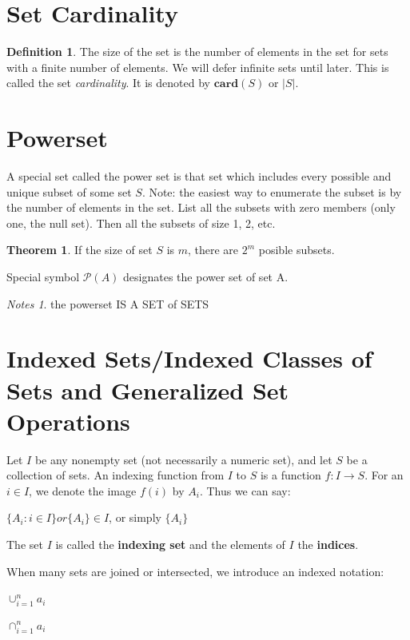 \documentclass[11pt]{book} %
\theoremstyle {definition}
\newtheorem {definition}{Definition}[section]
\newtheorem {theorem}{Theorem}[section]
\theoremstyle {remark}
\newtheorem*{notes}{Notes}
\begin{document}
\section {Set Cardinality}
\begin {definition}
The size of the set is the number of elements in the set for sets with a finite number of elements. We will defer infinite sets until later. This is called the set \textit{cardinality}. It is denoted by $\mathbf{card}(S)$ or $|S|$.
\end{definition}

\section {Powerset}
A special set called the power set is that set which includes every possible and unique subset of some set $S$. 
Note: the easiest way to enumerate the subset is by the number of elements in the set. List all the subsets with zero members (only one, the null set). Then all the subsets of size 1, 2, etc. 
\begin {theorem}
If the size of set $S$ is $m$, there are $2^m$ posible subsets.
\end{theorem}

Special symbol  $\mathcal{P} (A)$ designates the power set of set A.

\begin{notes}
the powerset IS A SET of SETS
\end{notes}


\section {Indexed Sets/Indexed Classes of Sets and Generalized Set Operations }
Let $I$ be any nonempty set (not necessarily a numeric set), and let $S$ be a collection of sets. An indexing function from $I$ to $S$ is a function $f:I \rightarrow S$. For an $i \in I$, we denote the image $f(i)$ by $A_i$. Thus we can say:

$\{A_i : i \in I\} or \{A_i\} \in I$, or simply $\{A_i\}$

The set $I$ is called the \textbf{indexing set} and the elements of $I$ the \textbf{indices}. 

When many sets are joined or intersected, we introduce an indexed notation:


$\cup _{ i=1} ^ n a _{i}$

$\cap_{ i=1} ^ n a _{i}$
\end{document}
